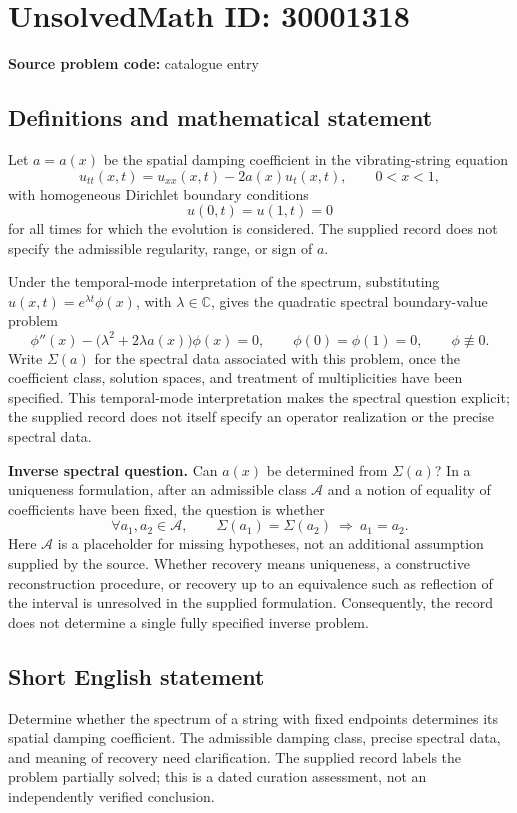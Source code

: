 \documentclass[11pt]{article}
\newcommand{\C}{\mathbb{C}}
\begin{document}
\section*{UnsolvedMath ID: 30001318}
\textbf{Source problem code:} catalogue entry
\subsection{Definitions and mathematical statement}
Let \(a=a(x)\) be the spatial damping coefficient in the vibrating-string equation
\[
 u_{tt}(x,t)=u_{xx}(x,t)-2a(x)u_t(x,t),\qquad 0<x<1,
\]
with homogeneous Dirichlet boundary conditions
\[
 u(0,t)=u(1,t)=0
\]
for all times for which the evolution is considered. The supplied record does not specify the admissible regularity, range, or sign of \(a\).

Under the temporal-mode interpretation of the spectrum, substituting \(u(x,t)=e^{\lambda t}\phi(x)\), with \(\lambda\in\C\), gives the quadratic spectral boundary-value problem
\[
 \phi''(x)-\bigl(\lambda^2+2\lambda a(x)\bigr)\phi(x)=0,
 \qquad \phi(0)=\phi(1)=0,\qquad \phi\not\equiv0.
\]
Write \(\Sigma(a)\) for the spectral data associated with this problem, once the coefficient class, solution spaces, and treatment of multiplicities have been specified. This temporal-mode interpretation makes the spectral question explicit; the supplied record does not itself specify an operator realization or the precise spectral data.

\textbf{Inverse spectral question.} Can \(a(x)\) be determined from \(\Sigma(a)\)? In a uniqueness formulation, after an admissible class \(\mathcal A\) and a notion of equality of coefficients have been fixed, the question is whether
\[
 \forall a_1,a_2\in\mathcal A,\qquad
 \Sigma(a_1)=\Sigma(a_2)\ \Longrightarrow\ a_1=a_2.
\]
Here \(\mathcal A\) is a placeholder for missing hypotheses, not an additional assumption supplied by the source. Whether recovery means uniqueness, a constructive reconstruction procedure, or recovery up to an equivalence such as reflection of the interval is unresolved in the supplied formulation. Consequently, the record does not determine a single fully specified inverse problem.
\subsection{Short English statement}
Determine whether the spectrum of a string with fixed endpoints determines its spatial damping coefficient. The admissible damping class, precise spectral data, and meaning of recovery need clarification. The supplied record labels the problem partially solved; this is a dated curation assessment, not an independently verified conclusion.
\end{document}
